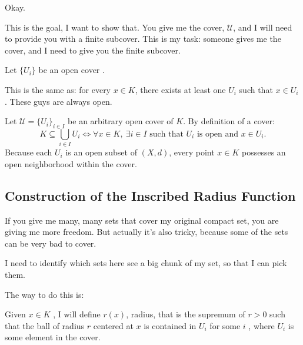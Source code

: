 \begin{proofWrapper}
\begin{speech}[01:07:41 - 01:09:11]
Okay.

This is the goal, I want to show that. You give me the cover, $\mathcal{U}$, and I will need to provide you with a finite subcover. This is my task: someone gives me the cover, and I need to give you the finite subcover.

Let $\{U_i\}$ be an open cover .

This is the same as: for every $x \in K$, there exists at least one $U_i$ such that $x \in U_i$ . These guys are always open.
\end{speech}

\begin{content}
Let $\mathcal{U} = \{ U_i \}_{i \in I}$ be an arbitrary open cover of $K$. By definition of a cover:
\begin{equation}\label{eq:cover-pointwise}
K \subseteq \bigcup_{i \in I} U_i \iff \forall x \in K, \ \exists i \in I \text{ such that } U_i \text{ is open and } x \in U_i.
\end{equation}
Because each $U_i$ is an open subset of $(X, d)$, every point $x \in K$ possesses an open neighborhood within the cover.
\end{content}

\subsection{Construction of the Inscribed Radius Function}

\begin{speech}[01:09:11 - 01:10:46]
If you give me many, many sets that cover my original compact set, you are giving me more freedom. But actually it's also tricky, because some of the sets can be very bad to cover.

I need to identify which sets here see a big chunk of my set, so that I can pick them.

The way to do this is:

Given $x \in K$ , I will define $r(x)$, radius, that is the supremum of $r > 0$ such that the ball of radius $r$ centered at $x$ is contained in $U_i$ for some $i$ , where $U_i$ is some element in the cover.


\end{speech}
\end{proofWrapper}

